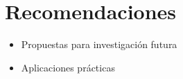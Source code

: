 \chapter{Recomendaciones} 

\begin{itemize}
    \item Propuestas para investigación futura
    \item Aplicaciones prácticas
\end{itemize}